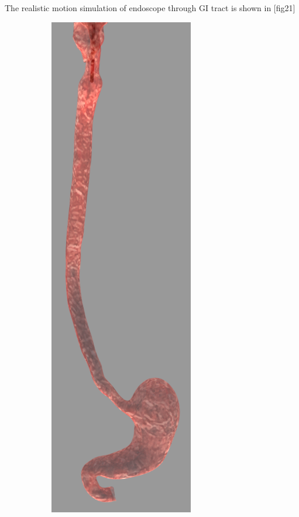 \documentclass[12pt,a4]{article}
\begin{document}
The realistic motion simulation of endoscope through GI tract is shown in [fig21]

\begin{figure}[ht!]
    \centering
    \begin{subfigure}{0.15\textwidth}
        \centering
        \includegraphics[width=0.75\linewidth]{figures/GIsnaps/1.png}
   

\end{subfigure}
\end{figure}
\end{document}
